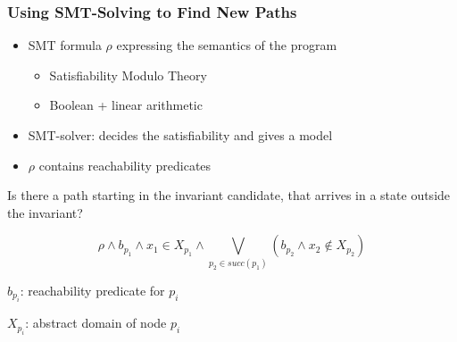\documentclass{beamer}
\begin{document}
\begin{frame}
\begin{columns}
\begin{column}{5.5cm}
{
}
\end{column}
\end{columns}
\end{frame}

\begin{frame}
  \frametitle{Using SMT-Solving to Find New Paths}
\begin{itemize}
\item SMT formula $\rho$ expressing the semantics of the program
\begin{itemize}
\item Satisfiability Modulo Theory
\item Boolean + linear arithmetic
\end{itemize}
\item SMT-solver: decides the satisfiability and gives a model
\item $\rho$ contains reachability predicates
\end{itemize}
\bigskip
\begin{center}
Is there a path starting in the invariant candidate, that arrives in a
state outside the invariant?
\end{center}
\bigskip 
$$\rho  \wedge b_{p_1} \wedge x_1 \in X_{p_1} \wedge \bigvee_{p_2 \in succ(p_1)}
 (b_{p_2} \wedge x_2 \notin X_{p_2})$$

\footnotesize{
$b_{p_i}$: reachability predicate for $p_i$

$X_{p_i}$: abstract domain of node $p_i$
}
\end{frame}
\end{document}

